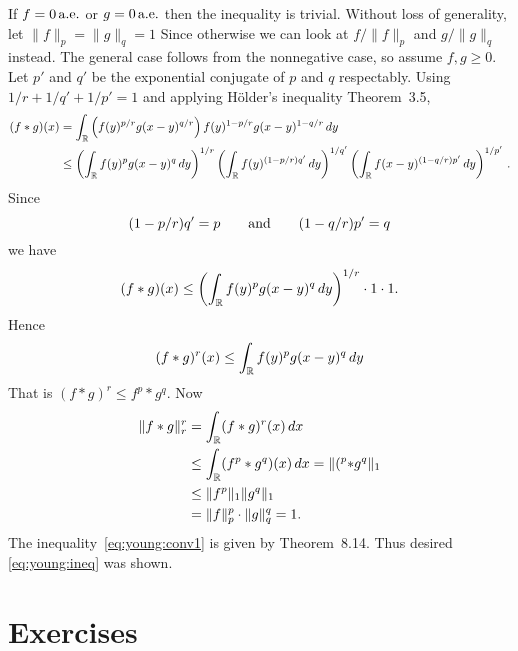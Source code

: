\begin{thmproof}
If \(f=0\,\textrm{a.e.}\) or \(g=0\,\textrm{a.e.}\) then the inequality is trivial.
Without loss of generality, let \(\|f\|_p = \|g\|_q = 1\)
Since otherwise we can look at 
\(f/\|f\|_p\) and \(g/\|g\|_q\) instead. The general
case follows from the nonnegative
case, so assume \(f, g \geq 0\). 
Let \(p'\) and \(q'\) be the exponential conjugate of $p$ and $q$ respectably.
Using \(1/r+1/q'+1/p'=1\) and 
applying H\"older’s inequality Theorem~3.5,
\begin{align*}
(f\ast g)(x)
&= \int_{\mathbb{R}}\left(f(y)^{p/r}g(x-y)^{q/r}\right)f(y)^{1-p/r}g(x-y)^{1-q/r}\,dy \\
&\leq 
  \left(\int_{\mathbb{R}} f(y)^pg(x-y)^q\,dy\right)^{1/r}
     \left(\int_{\mathbb{R}} f(y)^{(1-p/r)q'}\,dy\right)^{1/q'}
        \left(\int_{\mathbb{R}} f(x-y)^{(1-q/r)p'}\,dy\right)^{1/p'}\,.
\end{align*}
Since 
\begin{equation*}
(1-p/r)q' = p \qquad\textnormal{and}\qquad (1-q/r)p' =q
\end{equation*}
we have
\begin{equation*}
(f\ast g)(x) 
\leq \left(\int_{\mathbb{R}} f(y)^pg(x-y)^q\,dy\right)^{1/r}\cdot1\cdot1.
\end{equation*}
Hence
\begin{equation*}
(f\ast g)^r(x) \leq \int_{\mathbb{R}} f(y)^pg(x-y)^q\,dy
\end{equation*}
That is \((f\ast g)^r \leq f^p \ast g^q\).
Now
\begin{align}
\|f\ast g\|_r^r
&= \int_{\mathbb{R}} (f\ast g)^r(x)\,dx \notag \\
&\leq  \int_{\mathbb{R}} (f^p \ast g^q)(x)\,dx = \|(^p \ast g^q\|_1 \notag \\
&\leq \|f^p\|_1 \|g^q\|_1 \label{eq:young:conv1} \\
&=  \|f\|_p^p \cdot \|g\|_q^q = 1. \notag
\end{align}
The inequality~\eqref{eq:young:conv1} is given by Theorem~8.14.
Thus desired \eqref{eq:young:ineq} was shown.
\end{thmproof}

\section{Exercises} %

